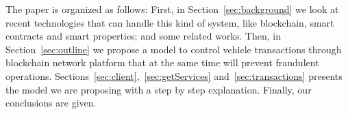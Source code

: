 The paper is organized as follows: 
First, in Section~\ref{sec:background}
we look at recent technologies that can handle this kind of system,
like blockchain, smart contracts and smart properties; and some related works.
Then, in Section~\ref{sec:outline}
we propose a model to control vehicle transactions through blockchain network platform 
that at the same time will prevent fraudulent operations. 
Sections~\ref{sec:client},~\ref{sec:getServices} and~\ref{sec:transactions} presents the model 
we are proposing with a step by step explanation. 
Finally, our conclusions are given.